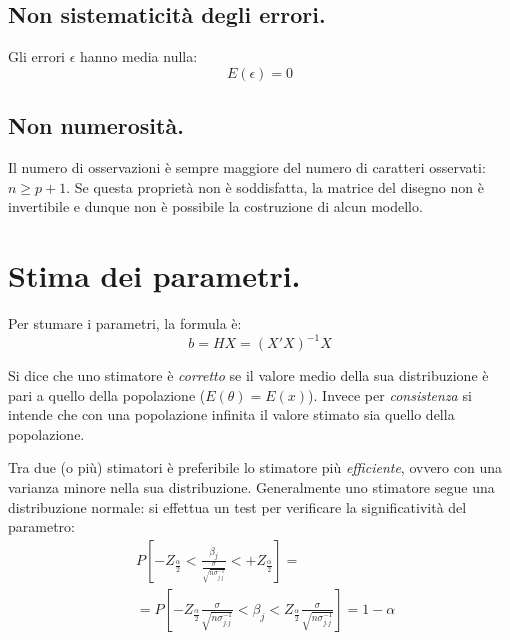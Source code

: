 \documentclass[11pt, twocolumn]{article}
\begin{document}
\subsection*{Non sistematicità degli errori.}
Gli errori $\epsilon$ hanno media nulla:
\begin{equation*}
  E(\epsilon) = 0
\end{equation*}

\subsection*{Non numerosità.}
Il numero di osservazioni è sempre maggiore del numero di caratteri osservati: $n \geq p + 1$.
Se questa proprietà non è soddisfatta, la matrice del disegno non è invertibile e dunque non è possibile la costruzione di alcun modello.


\section{Stima dei parametri.}
Per stumare i parametri, la formula è:
\begin{equation*}
  b = HX = (X'X)^{-1}X
\end{equation*}

Si dice che uno stimatore è \textit{corretto} se il valore medio della sua distribuzione è pari a quello della popolazione ($E(\theta) = E(x)$).
Invece per \textit{consistenza} si intende che con una popolazione infinita il valore stimato sia quello della popolazione.

Tra due (o più) stimatori è preferibile lo stimatore più \textit{efficiente}, ovvero con una varianza minore nella sua distribuzione.
Generalmente uno stimatore segue una distribuzione normale: si effettua un test per verificare la significatività del parametro:
\begin{align*}
  &P[-Z_{\frac{\alpha}{2}} < \frac{\beta_j}{\frac{\sigma}{\sqrt{n\sigma^{-1}_{j.j}}}} < +Z_{\frac{\alpha}{2}}] = \\
  &= P[-Z_{\frac{\alpha}{2}} \frac{\sigma}{\sqrt{n\sigma^{-1}_{j.j}}} < \beta_j < Z_{\frac{\alpha}{2}} \frac{\sigma}{\sqrt{n\sigma^{-1}_{j.j}}}] = 1 - \alpha
\end{align*}
\end{document}
